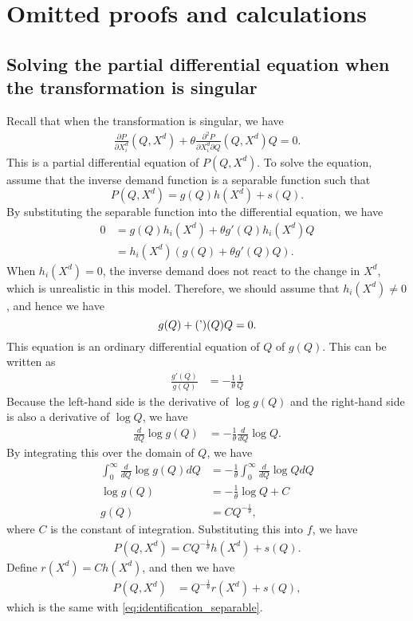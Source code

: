 \documentclass[11pt, a4paper]{article}
\theoremstyle{remark}
\begin{document}
\newpage







\appendix


\section{Omitted proofs and calculations}\label{app:ommitted_proof}

\subsection{Solving the partial differential equation when the transformation is singular}
Recall that when the transformation is singular, we have
\begin{align}
    \frac{\partial P}{\partial X^{d}_{i}}(Q, X^{d}) + \theta \frac{\partial^2 P}{\partial X^{d}_{i}\partial Q}(Q, X^{d})Q = 0.
\end{align}
This is a partial differential equation of $P(Q, X^{d})$.
To solve the equation, assume that the inverse demand function is a separable function such that 
\[P(Q, X^{d}) = g(Q)h(X^{d}) + s(Q).\]
By substituting the separable function into the differential equation, we have 
\begin{align}
   0 & =  g(Q) h_i(X^{d}) + \theta g'(Q)h_i(X^{d}) Q\\
   & = h_i(X^{d})( g(Q) + \theta g'(Q)Q).
\end{align}
When $h_i(X^{d}) = 0$, the inverse demand does not react to the change in $X^{d}$, which is unrealistic in this model.
Therefore, we should assume that $h_i(X^{d}) \ne 0$, and hence we have 
\[g(Q) + \thetag'(Q)Q = 0.\]
This equation is an ordinary differential equation of $Q$ of $g(Q)$.
This can be written as
\begin{align}
    \frac{g'(Q)}{g(Q)} &= -\frac{1}{\theta} \frac{1}{Q}
\end{align}
Because the left-hand side is the derivative of $\log g(Q)$ and the right-hand side is also a derivative of $\log Q$, we have
\begin{align}
        \frac{d}{dQ} \log g(Q) &= -\frac{1}{\theta} \frac{d}{dQ} \log Q.
\end{align}
By integrating this over the domain of $Q$, we have
\begin{align}
    \int_{0}^\infty \frac{d}{dQ} \log g(Q) dQ &= -\frac{1}{\theta} \int_{0}^\infty  \frac{d}{dQ} \log Q dQ \\
    \log g(Q) &= -\frac{1}{\theta} \log Q + C\\
    g(Q) &= C Q^{-\frac{1}{\theta}},
\end{align}
where $C$ is the constant of integration.
Substituting this into $f$, we have 
\begin{align}
    P(Q, X^{d}) = C Q^{-\frac{1}{\theta}} h(X^{d}) + s(Q).
\end{align}
Define $r(X^{d}) = Ch(X^{d})$, and then we have
\begin{align}
    P(Q, X^{d}) &= Q^{-\frac{1}{\theta}} r(X^{d}) + s(Q),
\end{align}
which is the same with \eqref{eq:identification_separable}.
\end{document}
